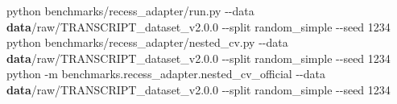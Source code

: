 \documentclass[
  10pt,
]{ctexart}
\newenvironment{Shaded}{}{}
\newcommand{\DataTypeTok}[1]{\textcolor[rgb]{0.56,0.13,0.00}{#1}}
\newcommand{\DecValTok}[1]{\textcolor[rgb]{0.25,0.63,0.44}{#1}}
\newcommand{\FunctionTok}[1]{\textcolor[rgb]{0.02,0.16,0.49}{#1}}
\newcommand{\KeywordTok}[1]{\textcolor[rgb]{0.00,0.44,0.13}{\textbf{#1}}}
\newcommand{\NormalTok}[1]{#1}
\newcommand{\OperatorTok}[1]{\textcolor[rgb]{0.40,0.40,0.40}{#1}}
\begin{document}
\begin{Shaded}
\begin{Highlighting}[]
\NormalTok{python benchmarks}\OperatorTok{/}\NormalTok{recess\_adapter}\OperatorTok{/}\NormalTok{run}\OperatorTok{.}\FunctionTok{py} \OperatorTok{{-}{-}}\NormalTok{data }\KeywordTok{data}\OperatorTok{/}\NormalTok{raw}\OperatorTok{/}\NormalTok{TRANSCRIPT\_dataset\_v2}\OperatorTok{.}\DecValTok{0.0} \OperatorTok{{-}{-}split}\NormalTok{ random\_simple }\OperatorTok{{-}{-}}\NormalTok{seed }\DecValTok{1234}
\DataTypeTok{python}\NormalTok{ benchmarks}\OperatorTok{/}\NormalTok{recess\_adapter}\OperatorTok{/}\NormalTok{nested\_cv}\OperatorTok{.}\FunctionTok{py} \OperatorTok{{-}{-}}\NormalTok{data }\KeywordTok{data}\OperatorTok{/}\NormalTok{raw}\OperatorTok{/}\NormalTok{TRANSCRIPT\_dataset\_v2}\OperatorTok{.}\DecValTok{0.0} \OperatorTok{{-}{-}split}\NormalTok{ random\_simple }\OperatorTok{{-}{-}}\NormalTok{seed }\DecValTok{1234}
\DataTypeTok{python} \OperatorTok{{-}}\NormalTok{m benchmarks}\OperatorTok{.}\FunctionTok{recess\_adapter}\OperatorTok{.}\FunctionTok{nested\_cv\_official} \OperatorTok{{-}{-}}\NormalTok{data }\KeywordTok{data}\OperatorTok{/}\NormalTok{raw}\OperatorTok{/}\NormalTok{TRANSCRIPT\_dataset\_v2}\OperatorTok{.}\DecValTok{0.0} \OperatorTok{{-}{-}split}\NormalTok{ random\_simple }\OperatorTok{{-}{-}}\NormalTok{seed }\DecValTok{1234}
\end{Highlighting}
\end{Shaded}
\end{document}
